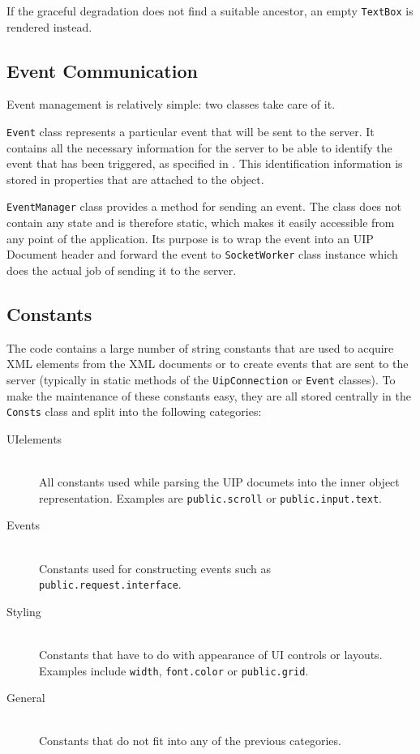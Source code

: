 If the graceful degradation does not find a suitable ancestor, an empty \texttt{TextBox} is rendered instead.

\subsection{Event Communication}
Event management is relatively simple: two classes take care of it.

\texttt{Event} class represents a particular event that will be sent to the server. It contains all the necessary information for the server to be able to identify the event that has been triggered, as specified in \cite{uip}. This identification information is stored in properties that are attached to the object.

\texttt{EventManager} class provides a method for sending an event. The class does not contain any state and is therefore static, which makes it easily accessible from any point of the application. Its purpose is to wrap the event into an UIP Document header and forward the event to \texttt{SocketWorker} class instance which does the actual job of sending it to the server.


\subsection{Constants}
The code contains a large number of string constants that are used to acquire XML elements from the XML documents or to create events that are sent to the server (typically in static methods of the \texttt{UipConnection} or \texttt{Event} classes). To make the maintenance of these constants easy, they are all stored centrally in the \texttt{Consts} class and split into the following categories:

\begin{description}
  \item[UIelements] \hfill \\
  All constants used while parsing the UIP documets into the inner object representation. Examples are \texttt{public.scroll} or \texttt{public.input.text}.
    \item[Events] \hfill \\
    Constants used for constructing events such as \texttt{public.request.interface}.
        \item[Styling] \hfill \\
    Constants that have to do with appearance of UI controls or layouts. Examples include \texttt{width}, \texttt{font.color} or \texttt{public.grid}.
    \item[General] \hfill \\
  Constants that do not fit into any of the previous categories.
\end{description}

